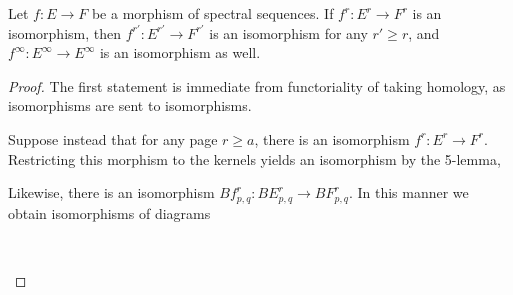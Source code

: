 \documentclass[../thesis.tex]{subfiles}
\begin{document}
        \begin{lemma}
            Let $f : E \rightarrow F$ be a morphism of spectral sequences. If $f^r : E^r \rightarrow F^r$ is an isomorphism, then $f^{r'} : E^{r'} \rightarrow F^{r'}$ is an isomorphism for any $r' \geq r$, and $f^\infty : E^\infty \rightarrow E^\infty$ is an isomorphism as well.
        \end{lemma}

        \begin{proof}
            The first statement is immediate from functoriality of taking homology, as isomorphisms are sent to isomorphisms. 
            
            Suppose instead that for any page $r \geq a$, there is an isomorphism $f^r : E^r \rightarrow F^r$. Restricting this morphism to the kernels yields an isomorphism by the 5-lemma,
            \begin{center}
            \end{center}
            Likewise, there is an isomorphism $Bf^r_{p,q} : BE^r_{p,q} \rightarrow BF^r_{p,q}$. In this manner we obtain isomorphisms of diagrams
            \begin{center}
                \\

\end{center}
\end{proof}
\end{document}
